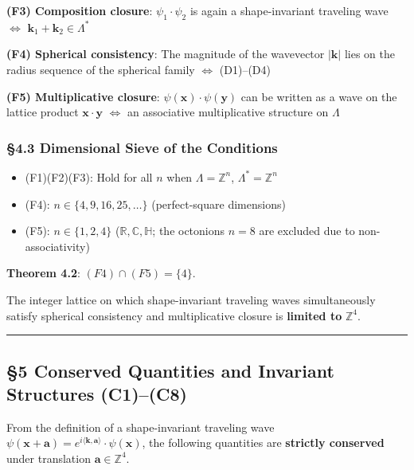 \documentclass[
  a4paper,11pt]{article}
\providecommand{\tightlist}{%
  \setlength{\itemsep}{0pt}\setlength{\parskip}{0pt}}
\theoremstyle{definition}
\theoremstyle{remark}
\begin{document}
\textbf{(F3) Composition closure}: \(\psi_1 \cdot \psi_2\) is again a
shape-invariant traveling wave \(\Leftrightarrow\)
\(\mathbf{k}_1 + \mathbf{k}_2 \in \Lambda^*\)

\textbf{(F4) Spherical consistency}: The magnitude of the wavevector
\(|\mathbf{k}|\) lies on the radius sequence of the spherical family
\(\Leftrightarrow\) (D1)--(D4)

\textbf{(F5) Multiplicative closure}:
\(\psi(\mathbf{x}) \cdot \psi(\mathbf{y})\) can be written as a wave on
the lattice product \(\mathbf{x} \cdot \mathbf{y}\) \(\Leftrightarrow\)
an associative multiplicative structure on \(\Lambda\)

\subsubsection{§4.3 Dimensional Sieve of the
Conditions}\label{dimensional-sieve-of-the-conditions}

\begin{itemize}
\tightlist
\item
  (F1)(F2)(F3): Hold for all \(n\) when \(\Lambda = \mathbb{Z}^n\),
  \(\Lambda^* = \mathbb{Z}^n\)
\item
  (F4): \(n \in \{4, 9, 16, 25, \ldots\}\) (perfect-square dimensions)
\item
  (F5): \(n \in \{1, 2, 4\}\) (\(\mathbb{R}, \mathbb{C}, \mathbb{H}\);
  the octonions \(n = 8\) are excluded due to non-associativity)
\end{itemize}

\textbf{Theorem 4.2}: \((F4) \cap (F5) = \{4\}\).

The integer lattice on which shape-invariant traveling waves
simultaneously satisfy spherical consistency and multiplicative closure
is \textbf{limited to} \(\mathbb{Z}^4\).

\begin{center}\rule{0.5\linewidth}{0.5pt}\end{center}

\subsection{§5 Conserved Quantities and Invariant Structures
(C1)--(C8)}\label{conserved-quantities-and-invariant-structures-c1c8}

From the definition of a shape-invariant traveling wave
\(\psi(\mathbf{x} + \mathbf{a}) = e^{i\langle \mathbf{k}, \mathbf{a} \rangle} \cdot \psi(\mathbf{x})\),
the following quantities are \textbf{strictly conserved} under
translation \(\mathbf{a} \in \mathbb{Z}^4\).
\end{document}
